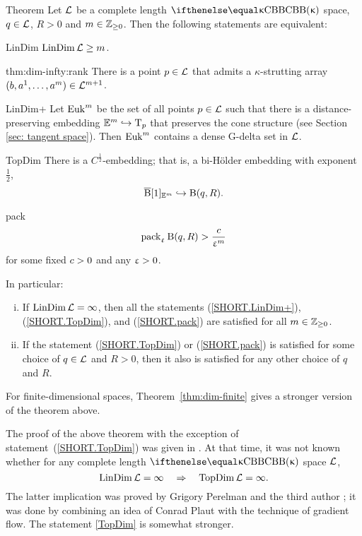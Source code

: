 \begin{thm}{Theorem}\label{thm:dim-infty}
Let $\mathcal{L}$ be a complete length $\Alex{\kappa}$ space, 
$q\in \spc{L}$, 
$R>0$ 
and $m\in \ZZ_{\ge0}$.
Then the following statements are equivalent:
\begin{subthmA}{LinDim}  $\LinDim\spc{L}\ge m$.
\end{subthmA}

\begin{subthmA}{thm:dim-infty:rank}
There is a point $p\in\spc{L}$ that admits a $\kappa$-strutting array $(b,a^1,\dots,a^m)\in\spc{L}^{m+1}$.
\end{subthmA}

\begin{subthmA}{LinDim+} Let $\mathop{\rm Euk}\nolimits^m$ be the set 
of all points $p\in \spc{L}$ such that there is a distance-preserving embedding $\EE^m\hookrightarrow \T_p$
that preserves the cone structure 
(see Section  \ref{sec: tangent space}).
Then $\mathop{\rm Euk}\nolimits^m$  contains a dense G-delta set in $\mathcal{L}$.
\end{subthmA}

\begin{subthmA}{TopDim}
There is a $C^{\frac{1}{2}}$-embedding; that is, a bi-Hölder embedding with exponent $\tfrac{1}{2}$,
\[\cBall[1]_{\EE^m}\hookrightarrow \oBall(q,R).\]
\end{subthmA}

\begin{subthmA}{pack} 
\[\mathop{\rm pack}\nolimits_\upvarepsilon \mathrm{B}{}(q,R)>\frac{c}{\upvarepsilon^m}\]
for some fixed $c>0$ and any $\upvarepsilon>0$.
\end{subthmA}

\medskip

In particular:
\begin{enumerate}[(i)]
\item If $\mathop{\rm LinDim}\nolimits\mathcal{L}=\infty$, then all the statements (\ref{SHORT.LinDim+}), (\ref{SHORT.TopDim}), and (\ref{SHORT.pack}) are satisfied for all $m\in\ZZ_{\ge0}$. 
\item 
 If the statement (\ref{SHORT.TopDim}) or (\ref{SHORT.pack}) is satisfied for some choice of $q\in \spc{L}$ and $R>0$, then it also is satisfied for any other choice of $q$ and $R$.
\end{enumerate}
\end{thm}

For finite-dimensional spaces, Theorem~\ref{thm:dim-finite} gives a stronger version 
of the theorem above.

The proof of the above theorem with the exception of  statement~(\ref{SHORT.TopDim}) was given in \cite{plaut:dimension}.
At that time, it was not known whether for any complete length $\Alex\kappa$ space $\mathcal{L}$,
\[\mathop{\rm LinDim}\nolimits\mathcal{L}=\infty\quad \Rightarrow\quad \mathop{\rm TopDim}\nolimits\mathcal{L}=\infty.\]
The latter implication was proved by Grigory Perelman and the third author \cite{perelman-petrunin:qg};
it was done by combining an idea of Conrad Plaut with the technique of gradient flow.
The statement \ref{TopDim} is somewhat stronger.


